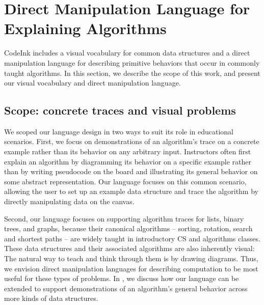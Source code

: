 \section{Direct Manipulation Language for Explaining Algorithms}

CodeInk includes a visual vocabulary for common data structures and a direct
manipulation language for describing primitive behaviors that occur in commonly
taught algorithms. In this section, we describe the scope of this work, and
present our visual vocabulary and direct manipulation language.

\subsection{Scope: concrete traces and visual problems}

We scoped our language design in two ways to suit its role in educational
scenarios. First, we focus on demonstrations of an algorithm's trace on a
concrete example rather than its behavior on any arbitrary input. Instructors
often first explain an algorithm by diagramming its behavior on a specific
example rather than by writing pseudocode on the board and illustrating its
general behavior on some abstract representation. Our language focuses on this
common scenario, allowing the user to set up an example data structure and trace
the algorithm by directly manipulating data on the canvas.

Second, our language focuses on supporting algorithm traces for lists, binary
trees, and graphs, because their canonical algorithms -- sorting, rotation,
search and shortest paths -- are widely taught in introductory CS and algorithms
classes. These data structures and their associated algorithms are also
inherently visual: The natural way to teach and think through them is by drawing
diagrams. Thus, we envision direct manipulation languages for describing
computation to be most useful for these types of problems.
%
%
In , we discuss how our language can be
extended to support demonstrations of an algorithm's general behavior
across more kinds of data structures.


